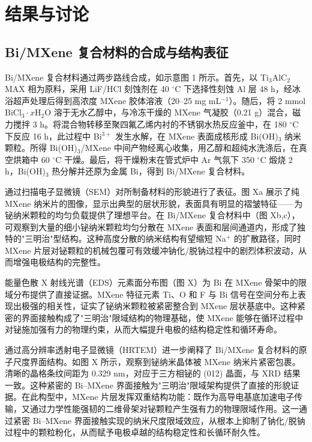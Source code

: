 \section{结果与讨论}

\subsection{Bi/MXene 复合材料的合成与结构表征}

Bi/MXene 复合材料通过两步路线合成，如示意图 1 所示。首先，以 Ti$_{3}$AlC$_{2}$ MAX 相为原料，采用 LiF/HCl 刻蚀剂在 40 $^{\circ}$C 下选择性刻蚀 Al 层 48 h，经冰浴超声处理后得到高浓度 MXene 胶体溶液（20--25 mg mL$^{-1}$）。随后，将 2 mmol BiCl$_{3}\cdot x$H$_{2}$O 溶于无水乙醇中，与冷冻干燥的 MXene 气凝胶（0.21 g）混合，磁力搅拌 3 h。将混合物转移至聚四氟乙烯内衬的不锈钢水热反应釜中，在 180 $^{\circ}$C 下反应 16 h，此过程中 Bi$^{3+}$ 发生水解，在 MXene 表面成核形成 Bi(OH)$_{3}$ 纳米颗粒。所得 Bi(OH)$_{3}$/MXene 中间产物经离心收集，用乙醇和超纯水洗涤后，在真空烘箱中 60 $^{\circ}$C 干燥。最后，将干燥粉末在管式炉中 Ar 气氛下 350 $^{\circ}$C 煅烧 2 h，Bi(OH)$_{3}$ 热分解并还原为金属 Bi，得到 Bi/MXene 复合材料。

通过扫描电子显微镜（SEM）对所制备材料的形貌进行了表征。图 Xa 展示了纯 MXene 纳米片的图像，显示出典型的层状形貌，表面具有明显的褶皱特征——为铋纳米颗粒的均匀负载提供了理想平台。在 Bi/MXene 复合材料中（图 Xb,c），可观察到大量的细小铋纳米颗粒均匀分散在 MXene 表面和层间通道内，形成了独特的"三明治"型结构。这种高度分散的纳米结构有望缩短 Na$^{+}$ 的扩散路径，同时 MXene 片层对铋颗粒的机械包覆可有效缓冲钠化/脱钠过程中的剧烈体积波动，从而增强电极结构的完整性。

能量色散 X 射线光谱（EDS）元素面分布图（图 X）为 Bi 在 MXene 骨架中的限域分布提供了直接证据。MXene 特征元素 Ti、O 和 F 与 Bi 信号在空间分布上表现出极强的相关性，证实了铋纳米颗粒被紧密整合到 MXene 层状基底中。这种紧密的界面接触构成了"三明治"限域结构的物理基础，使 MXene 能够在循环过程中对铋施加强有力的物理约束，从而大幅提升电极的结构稳定性和循环寿命。

通过高分辨率透射电子显微镜（HRTEM）进一步阐释了 Bi/MXene 复合材料的原子尺度界面结构。如图 X 所示，观察到铋纳米晶体被 MXene 纳米片紧密包裹。清晰的晶格条纹间距为 0.329 nm，对应于三方相铋的 (012) 晶面，与 XRD 结果一致。这种紧密的 Bi--MXene 界面接触为"三明治"限域架构提供了直接的形貌证据。在此构型中，MXene 片层发挥双重结构功能：既作为高导电基底加速电子传输，又通过力学性能强韧的二维骨架对铋颗粒产生强有力的物理限域作用。这一通过紧密 Bi--MXene 界面接触实现的纳米尺度限域效应，从根本上抑制了钠化/脱钠过程中的颗粒粉化，从而赋予电极卓越的结构稳定性和长循环耐久性。

